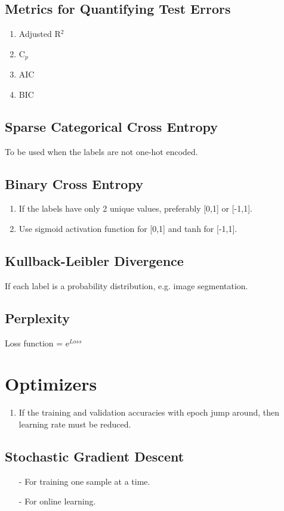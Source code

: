 \documentclass[a4paper, 12pt]{report}
\begin{document}
\section{Metrics for Quantifying Test Errors}
\begin{enumerate}
\item Adjusted R${^2}$
\item C${_p}$
\item AIC
\item BIC
\end{enumerate}

\section{Sparse Categorical Cross Entropy}
To be used when the labels are not one-hot encoded.
\section{Binary Cross Entropy}
\begin{enumerate}
\item If the labels have only 2 unique values, preferably [0,1] or [-1,1].
\item Use sigmoid activation function for [0,1] and tanh for [-1,1].
\end{enumerate}

\section{Kullback-Leibler Divergence}
If each label is a probability distribution, e.g. image segmentation.

\section{Perplexity}
Loss function = e$^{Loss}$
\chapter{Optimizers}
\begin{enumerate}
\item If the training and validation accuracies with epoch jump around, then learning rate must be reduced.
\end{enumerate}

\section{Stochastic Gradient Descent}
\begin{itemize}
\item[-] For training one sample at a time.

\item[-] For online learning.
\end{itemize}
\end{document}
